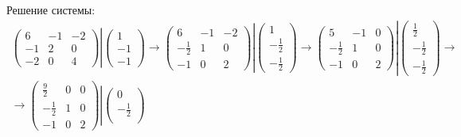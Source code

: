 \documentclass[12pt]{article}
\begin{document}
    Решение системы:
    \begin{gather*}
        \begin{pmatrix}
            6  & -1 & -2 \\
            -1 & 2  & 0  \\
            -2 & 0  & 4
        \end{pmatrix}
        \left |
        \begin{pmatrix}
            1  \\
            -1 \\
            -1
        \end{pmatrix}
        \right .
        \rightarrow
        \begin{pmatrix}
            6             & -1 & -2 \\
            - \frac{1}{2} & 1  & 0  \\
            -1            & 0  & 2
        \end{pmatrix}
        \left |
        \begin{pmatrix}
            1             \\
            - \frac{1}{2} \\
            - \frac{1}{2}
        \end{pmatrix}
        \right .
        \rightarrow
        \begin{pmatrix}
            5             & -1 & 0 \\
            - \frac{1}{2} & 1  & 0 \\
            -1            & 0  & 2
        \end{pmatrix}
        \left |
        \begin{pmatrix}
            \frac{1}{2}   \\
            - \frac{1}{2} \\
            - \frac{1}{2}
        \end{pmatrix}
        \right .
        \rightarrow \\
        \rightarrow
        \begin{pmatrix}
            \frac{9}{2}   & 0 & 0 \\
            - \frac{1}{2} & 1 & 0 \\
            -1            & 0 & 2
        \end{pmatrix}
        \left |
        \begin{pmatrix}
            0             \\
            - \frac{1}{2} \\

\end{pmatrix}
\end{gather*}
\end{document}
